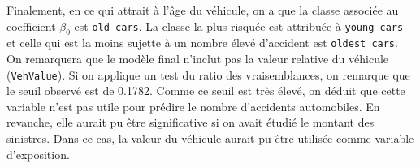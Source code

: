 \documentclass{article}
\begin{document}
	Finalement, en ce qui attrait à l'âge du véhicule, on a que la classe associée au coefficient $\beta_0$ est \texttt{old cars}. La classe la plus risquée est attribuée à \texttt{young cars} et celle qui est la moins sujette à un nombre élevé d'accident est \texttt{oldest cars}.\\
	
	On remarquera que le modèle final n'inclut pas la valeur relative du véhicule (\texttt{VehValue}). Si on applique un test du ratio des vraisemblances, on remarque que le seuil observé est de 0.1782. Comme ce seuil est très élevé, on déduit que cette variable n'est pas utile pour prédire le nombre d'accidents automobiles. En revanche, elle aurait pu être significative si on avait étudié le montant des sinistres. Dans ce cas, la valeur du véhicule aurait pu être utilisée comme variable d'exposition.
	
	
	
		
	
	\appendix
\end{document}
